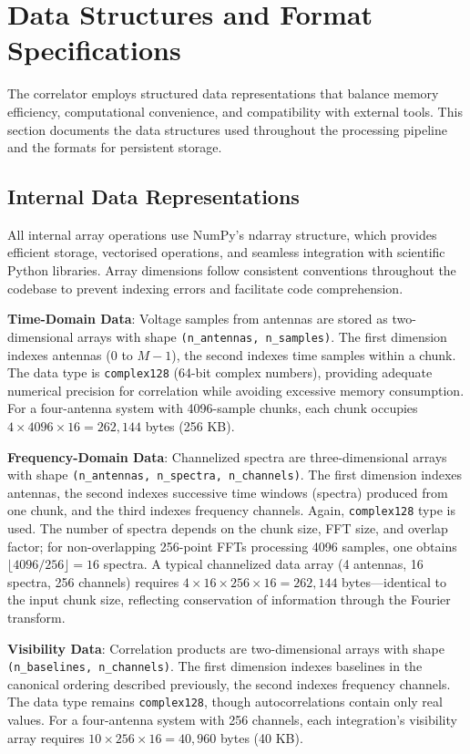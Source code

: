 \section{Data Structures and Format Specifications}

The correlator employs structured data representations that balance memory efficiency, computational convenience, and compatibility with external tools. This section documents the data structures used throughout the processing pipeline and the formats for persistent storage.

\subsection{Internal Data Representations}

All internal array operations use NumPy's ndarray structure, which provides efficient storage, vectorised operations, and seamless integration with scientific Python libraries. Array dimensions follow consistent conventions throughout the codebase to prevent indexing errors and facilitate code comprehension.

\textbf{Time-Domain Data}: Voltage samples from antennas are stored as two-dimensional arrays with shape \texttt{(n\_antennas, n\_samples)}. The first dimension indexes antennas ($0$ to $M-1$), the second indexes time samples within a chunk. The data type is \texttt{complex128} (64-bit complex numbers), providing adequate numerical precision for correlation while avoiding excessive memory consumption. For a four-antenna system with 4096-sample chunks, each chunk occupies $4 \times 4096 \times 16 = 262{,}144$ bytes (256 KB).

\textbf{Frequency-Domain Data}: Channelized spectra are three-dimensional arrays with shape \texttt{(n\_antennas, n\_spectra, n\_channels)}. The first dimension indexes antennas, the second indexes successive time windows (spectra) produced from one chunk, and the third indexes frequency channels. Again, \texttt{complex128} type is used. The number of spectra depends on the chunk size, FFT size, and overlap factor; for non-overlapping 256-point FFTs processing 4096 samples, one obtains $\lfloor 4096 / 256 \rfloor = 16$ spectra. A typical channelized data array (4 antennas, 16 spectra, 256 channels) requires $4 \times 16 \times 256 \times 16 = 262{,}144$ bytes—identical to the input chunk size, reflecting conservation of information through the Fourier transform.

\textbf{Visibility Data}: Correlation products are two-dimensional arrays with shape \texttt{(n\_baselines, n\_channels)}. The first dimension indexes baselines in the canonical ordering described previously, the second indexes frequency channels. The data type remains \texttt{complex128}, though autocorrelations contain only real values. For a four-antenna system with 256 channels, each integration's visibility array requires $10 \times 256 \times 16 = 40{,}960$ bytes (40 KB).

